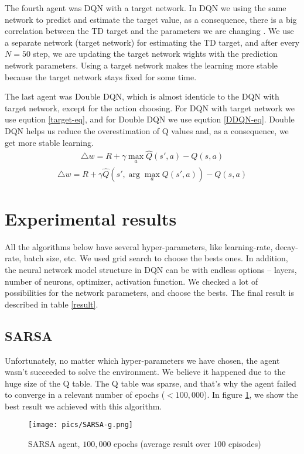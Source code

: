 \documentclass{article}
\begin{document}
	The fourth agent was DQN with a target network. In DQN we using the same network to predict and estimate the target value, as a consequence, there is a big correlation between the TD target and the parameters we are changing \cite{cow}. We use a separate network (target network) for estimating the TD target, and after every $ N = 50 $ step, we are updating the target network wights with the prediction network parameters. Using a target network makes the learning more stable because the target network stays fixed for some time.
	
	The last agent was Double DQN, which is almost identicle to the DQN with target network, except for the action choosing. For DQN with target network we use eqution \ref{target-eq}, and for Double DQN we use eqution \ref{DDQN-eq}. Double DQN helps us reduce the overestimation of Q values and, as a consequence, we get more stable learning.
	\begin{gather}\label{target-eq}
	\triangle w = R + \gamma \max_a \hat{Q}(s',a) - Q(s,a)
	\end{gather}
	\begin{gather}\label{DDQN-eq}
	\triangle w = R + \gamma  \hat{Q}(s',\arg \max_a Q(s',a)) - Q(s,a)
	\end{gather}
	\newpage
	\section{Experimental results}
	All the algorithms below have several hyper-parameters, like learning-rate, decay-rate, batch size, etc.
	We used grid search to choose the bests ones. In addition, the neural network model structure in DQN can be with endless options -- layers, number of neurons, optimizer, activation function. We checked a lot of possibilities for the network parameters, and choose the bests. The final result is described in table \ref{result}.
	\subsection{SARSA}
	Unfortunately, no matter which hyper-parameters we have chosen, the agent wasn't succeeded to solve the environment.
	We believe it happened due to the huge size of the Q table. The Q table was sparse, and that's why the agent failed to converge in a relevant number of epochs ($ < 100,000 $).  In figure \ref{SARSA}, we show the best result we achieved with this algorithm. 
	
	\begin{figure}[h!]
		\begin{center}
			\texttt{[image: pics/SARSA-g.png]}
		\end{center}
		\caption{SARSA agent, $ 100,000 $ epochs (average result over $ 100 $ episodes)}
		\label{SARSA}
	\end{figure}
\end{document}

